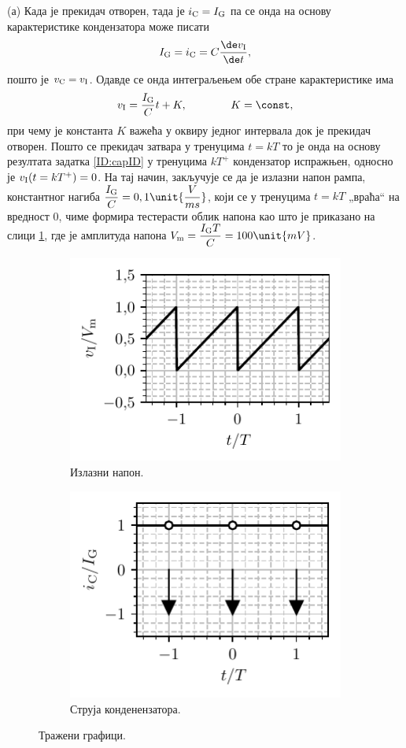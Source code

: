 (а) Када је прекидач отворен, тада је $i_{\rm C} = I_{\rm G}$ па се онда на основу карактеристике кондензатора 
може писати 
\begin{equation}
    I_{\rm G} = i_{\rm C} = C \dfrac{\de v_{\rm I}}{\de t},  \label{\ID.cchar}
\end{equation}
 пошто је $v_{\rm C} = v_{\rm I}$. Одавде се онда интеграљењем обе 
стране карактеристике има 
\begin{eqnarray}
    v_{\rm I} = \dfrac{I_{\rm G}}{C} t + K, \qquad\qquad K = \const, \label{\ID.eqvin}
\end{eqnarray}
при чему је константа $K$ важећа у оквиру једног интервала док је прекидач отворен. 
Пошто се прекидач затвара у тренуцима $t = kT$ то је онда 
на основу резултата задатка \ref{ID:capID}
у тренуцима $kT^+$ кондензатор испражњен, односно је 
$v_{\rm I}(t = kT^+) = 0$. На тај начин, закључује се да је излазни напон рампа, константног нагиба 
$\dfrac{I_{\rm G}}{C} = 0,1 \unit{\dfrac{V}{ms}}$, који се у тренуцима $t = kT$ „враћа“ на вредност 0, чиме формира тестерасти облик напона 
као што је приказано на слици \ref{\ID.vi}, где је амплитуда напона
$V_{\rm m} = \dfrac{I_{\rm G} T}{C} = 100\unit{mV}$. 
%
\begin{figure}[ht!]
    \centering
        \begin{subfigure}[c]{0.45\textwidth}
            \centering
            \includegraphics[scale=1]
            {fig/zCpi_vi.pdf}
            \caption{Излазни напон.}
            \label{\ID.vi}
        \end{subfigure}
        \begin{subfigure}[c]{0.45\textwidth}
            \centering
            \includegraphics[scale=1]
            {fig/zCpi_ic.pdf}
            \caption{Струја конденензатора.}
            \label{\ID.ic}
        \end{subfigure}
    \caption{Тражени графици.}
\end{figure}
